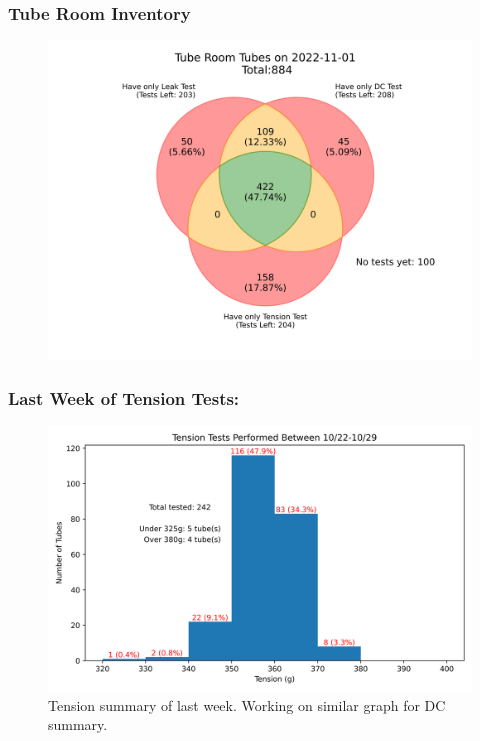 \documentclass{beamer}
\begin{document}
\begin{frame}
	\frametitle{Tube Room Inventory}
	\begin{figure}
		\centering
		\includegraphics[width=0.7\linewidth]{"tubepopulation.png"}
	\end{figure}
\end{frame}

\begin{frame}
	\frametitle{Last Week of Tension Tests:}
	\begin{figure} 
		\includegraphics[width=0.8\linewidth]{"last_week_tt.png"}
		\caption[width=0.5\linewidth]{Tension summary of last week. Working on similar graph for DC summary.}
	\end{figure}
	
	
\end{frame}
\end{document}
